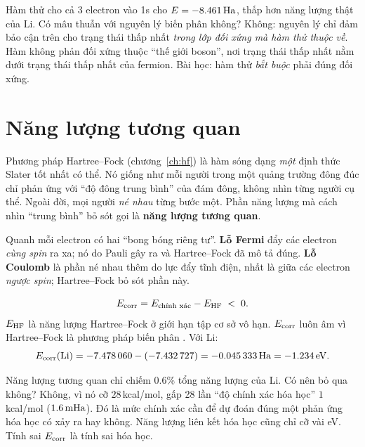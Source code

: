 \begin{hieulam}
Hàm thử cho cả 3 electron vào 1s cho $E=-8.461\,\mathrm{Ha}$, thấp hơn năng lượng thật của Li. Có mâu thuẫn với nguyên lý biến phân không? Không: nguyên lý chỉ đảm bảo cận trên cho trạng thái thấp nhất \emph{trong lớp đối xứng mà hàm thử thuộc về}. Hàm không phản đối xứng thuộc ``thế giới boson'', nơi trạng thái thấp nhất nằm dưới trạng thái thấp nhất của fermion. Bài học: hàm thử \emph{bắt buộc} phải đúng đối xứng.
\end{hieulam}

\section{Năng lượng tương quan}\label{sec:tuongquan}

\begin{eli5}
Phương pháp Hartree--Fock (chương~\ref{ch:hf}) là hàm sóng dạng \emph{một} định thức Slater tốt nhất có thể. Nó giống như mỗi người trong một quảng trường đông đúc chỉ phản ứng với ``độ đông trung bình'' của đám đông, không nhìn từng người cụ thể. Ngoài đời, mọi người \emph{né nhau} từng bước một. Phần năng lượng mà cách nhìn ``trung bình'' bỏ sót gọi là \textbf{năng lượng tương quan}.

Quanh mỗi electron có hai ``bong bóng riêng tư''. \textbf{Lỗ Fermi} đẩy các electron \emph{cùng spin} ra xa; nó do Pauli gây ra và Hartree--Fock đã mô tả đúng. \textbf{Lỗ Coulomb} là phần né nhau thêm do lực đẩy tĩnh điện, nhất là giữa các electron \emph{ngược spin}; Hartree--Fock bỏ sót phần này.
\end{eli5}

\begin{congthuc}
\[
E_{\mathrm{corr}} = E_{\text{chính xác}} - E_{\mathrm{HF}} \;<\; 0 .
\]
$E_{\mathrm{HF}}$ là năng lượng Hartree--Fock ở giới hạn tập cơ sở vô hạn. $E_{\mathrm{corr}}$ luôn âm vì Hartree--Fock là phương pháp biến phân \cite{Lowdin1955}. Với Li:
\[
E_{\mathrm{corr}}(\text{Li})=-7.478\,060-(-7.432\,727)=-0.045\,333\,\mathrm{Ha}=-1.234\,\mathrm{eV} .
\]
\end{congthuc}

Năng lượng tương quan chỉ chiếm 0.6\% tổng năng lượng của Li. Có nên bỏ qua không? Không, vì nó cỡ $28$\,kcal/mol, gấp 28 lần ``độ chính xác hóa học'' $1$\,kcal/mol ($1.6\,\mathrm{mHa}$). Đó là mức chính xác cần để dự đoán đúng một phản ứng hóa học có xảy ra hay không. Năng lượng liên kết hóa học cũng chỉ cỡ vài eV. Tính sai $E_{\mathrm{corr}}$ là tính sai hóa học.

